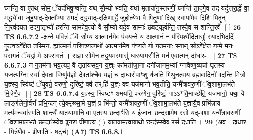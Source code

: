 \documentclass[17pt]{extarticle}
\begin{document}
                  घ्नन्ति॒ वा ए॒तथ् सोमं॒ ॅयद॑भिषु॒ण्वन्ति॒ यथ् सौ॒म्यो भव॑ति॒ यथा॑ मृ॒ताया॑नु॒स्तर॑णीं॒ घ्नन्ति॑ ता॒दृगे॒व तद् यदु॑त्तरा॒र्द्धे वा॒ मद्ध्ये॑ वा जुहु॒याद्-दे॒वता᳚भ्यः स॒मदं॑ दद्ध्याद्-दक्षिणा॒र्द्धे जु॑होत्ये॒षा वै पि॑तृ॒णां दिख् स्वाया॑मे॒व दि॒शि पि॒तॄन् नि॒रव॑दयत उद्गा॒तृभ्यो॑ हरन्ति सामदेव॒त्यो॑ वै सौ॒म्यो यदे॒व साम्नः॑ छंबट्कु॒र्वन्ति॒ तस्यै॒व स शान्ति॒रवे᳚- [  ] \textbf{  26} \newline
                  \newline
                                \textbf{ TS 6.6.7.2} \newline
                  -क्षन्ते प॒वित्रं॒ ॅवै सौ॒म्य आ॒त्मान॑मे॒व प॑वयन्ते॒ य आ॒त्मानं॒ न प॑रि॒पश्ये॑दि॒तासुः॑ स्यादभिद॒दिं कृ॒त्वाऽवे᳚क्षेत॒ तस्मि॒न॒. ह्या᳚त्मानं॑ परि॒पश्य॒त्यथो॑ आ॒त्मान॑मे॒व प॑वयते॒ यो ग॒तम॑नाः॒ स्याथ् सोऽवे᳚क्षेत॒ यन्मे॒ मनः॒ परा॑गतं॒ ॅयद्वा॑ मे॒ अप॑रागतं । राज्ञा॒ सोमे॑न॒ तद्व॒यम॒स्मासु॑ धारयाम॒सीति॒ मन॑ ए॒वात्मन् दा॑धार॒- [  ] \textbf{  27} \newline
                  \newline
                                \textbf{ TS 6.6.7.3} \newline
                  न ग॒तम॑ना भव॒त्यप॒ वै तृ॑तीयसव॒ने य॒ज्ञ्ः क्रा॑मतीजा॒ना-दनी॑जानम॒भ्या᳚-ग्नावैष्ण॒व्यर्चा घृ॒तस्य॑ यजत्य॒ग्निः सर्वा॑ दे॒वता॒ विष्णु॑र्य॒ज्ञो दे॒वता᳚श्चै॒व य॒ज्ञ्ं च॑ दाधारोपाꣳ॒॒शु य॑जति मिथुन॒त्वाय॑ ब्रह्मवा॒दिनो॑ वदन्ति मि॒त्रो य॒ज्ञ्स्य॒ स्वि॑ष्टं ॅयुवते॒ वरु॑णो॒ दुरि॑ष्टं॒ क्व॑ तर्.हि॑ य॒ज्ञ्ः क्व॑ यज॑मानो भव॒तीति॒ यन्मै᳚त्रावरु॒णीं ॅव॒शामा॒लभ॑ते मि॒त्रेणै॒व- [  ] \textbf{  28} \newline
                  \newline
                                \textbf{ TS 6.6.7.4} \newline
                  य॒ज्ञ्स्य॒ स्वि॑ष्टꣳ शमयति॒ वरु॑णेन॒ दुरि॑ष्टं॒ नाऽऽ*र्ति॒मार्च्छ॑ति॒ यज॑मानो॒ यथा॒ वै लाङ्ग॑लेनो॒र्वरां᳚ प्रभि॒न्दन्-त्ये॒वमृ॑ख्सा॒मे य॒ज्ञ्ं प्र भि॑न्तो॒ यन्मै᳚त्रावरु॒णीं ॅव॒शामा॒लभ॑ते य॒ज्ञायै॒व प्रभि॑न्नाय म॒त्य॑म॒न्ववा᳚स्यति॒ शान्त्यै॑ या॒तया॑मानि॒ वा ए॒तस्य॒ छन्दाꣳ॑सि॒ य ई॑जा॒नः छन्द॑सामे॒ष रसो॒ यद्-व॒शा यन्मै᳚त्रावरु॒णीं ॅव॒शामा॒लभ॑ते॒ छन्दाꣳ॑स्ये॒व पुन॒रा प्री॑णा॒त्य ( ) या॑तयामत्वा॒याथो॒ छन्द॑स्स्वे॒व रसं॑ दधाति ॥ \textbf{  29} \newline
                  \newline
                      (अव॑ - दाधार - मि॒त्रेणै॒व - प्री॑णाति॒ - षट्च॑)  \textbf{(A7)} \newline \newline
                                        \textbf{ TS 6.6.8.1} \newline
\end{document}
